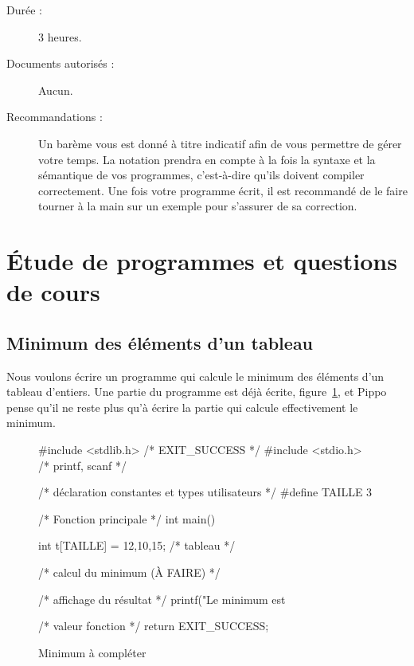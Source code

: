 

\setcounter{questioncount}{0}
\newcommand{\question}{\addtocounter{questioncount}{1}\paragraph{Question \Alph{questioncount}.}}
\newcommand{\commentaire}[1]{}
\newcommand{\pt}[1]{\fbox{$#1 \operatorname{pt}$}}


\setlength{\abovecaptionskip}{-10pt}



\vspace{-1cm}
\begin{description}
\item[Durée :] 3 heures.
\item[Documents autorisés :] Aucun.
\item[Recommandations :] Un barème vous est donné à
titre indicatif afin de vous permettre de gérer votre temps. La
notation prendra en compte à la fois la syntaxe et la sémantique de
vos programmes, c'est-à-dire qu'ils doivent compiler correctement. Une
fois votre programme écrit, il est recommandé de le faire tourner à la
main sur un exemple pour s'assurer de sa correction.
\end{description}


\section{Étude de programmes et questions de cours}


\subsection{Minimum des éléments d'un tableau}

Nous voulons écrire un programme qui calcule le minimum des éléments
d'un tableau d'entiers. Une partie du programme est déjà écrite, figure~\ref{fig:min}, et
Pippo pense qu'il ne
reste plus qu'à écrire la partie qui calcule effectivement le
minimum. 
\begin{figure}[htbp]
\begin{small}
\begin{listing}{1}
#include <stdlib.h> /* EXIT_SUCCESS */
#include <stdio.h> /* printf, scanf */

/* déclaration constantes et types utilisateurs */
#define TAILLE 3

/* Fonction principale */
int main()
{
  int t[TAILLE] = {12,10,15}; /* tableau */



  /* calcul du minimum (À FAIRE) */





  /* affichage du résultat */
  printf("Le minimum est %

  /* valeur fonction */
  return EXIT_SUCCESS;
}
\end{listing}
\end{small}
  \caption{Minimum à compléter}
  \label{fig:min}
\end{figure}


